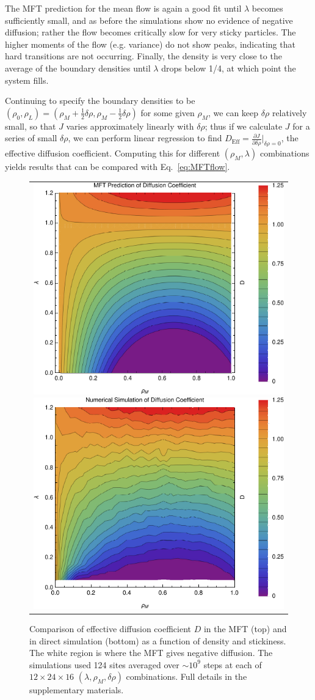 \documentclass[
reprint, amsmath,amssymb,
]{revtex4-1}
\newcommand{\partDeriv}[2]{\frac{\partial #1}{\partial #2}}
\begin{document}
The MFT prediction for the mean flow is again a good fit until $\lambda$ becomes sufficiently small,
and as before the simulations show no evidence of negative diffusion; rather the flow becomes critically slow for very sticky particles.
The higher moments of the flow (e.g. variance) do not show peaks, indicating that hard transitions are not occurring.
Finally, the density is very close to the average of the boundary densities until $\lambda$ drops below 1/4, at which point the system fills.

Continuing to specify the boundary densities to be $(\rho_0, \rho_L) = (\rho_M + \frac{1}{2} \delta\rho, \rho_M - \frac{1}{2} \delta\rho)$ for some given $\rho_M$, we can keep $\delta\rho$ relatively small, so that $J$ varies approximately
linearly with $\delta\rho$; thus if we calculate $J$ for a series of small $\delta \rho$, we can perform linear regression to find $D_\mathrm{Eff}=\partDeriv{J}{\delta\rho}\big|_{\delta\rho=0}$, the effective diffusion coefficient.
Computing this for different $(\rho_M, \lambda)$ combinations yields results that can be compared with Eq.~\ref{eq:MFTflow}.
\begin{figure}[h!]
\vspace{1em}
\begin{center}
 \begin{tabular}{c}
    \includegraphics[width=0.48\linewidth]{newAnalFlow}
    \includegraphics[width=0.48\linewidth]{newDataFlow}
    \end{tabular}
\end{center}
\caption{\label{fig:diffCoef}
Comparison of effective diffusion coefficient $D$ in the MFT (top) and in direct simulation (bottom) as a function of density and stickiness.
The white region is where the MFT gives negative diffusion. The simulations used 124 sites averaged over $\sim 10^9$ steps at each of $12 \times 24 \times 16 $ $(\lambda, \rho_M, \delta \rho)$ combinations.  
Full details in the supplementary materials.}
    \vspace{-2em}
\end{figure}
\end{document}
